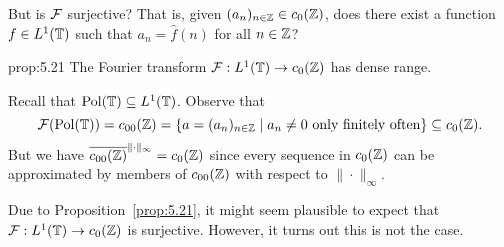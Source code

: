 But is ${\cal F}$ surjective? That is, given $(a_n)_{n\in\mathbb{Z}} \in c_0(\mathbb{Z})$, 
does there exist a function $f \in L^1(\mathbb{T})$ such that $a_n = \hat f(n)$ for all 
$n \in \mathbb{Z}$? 

\begin{prop}{prop:5.21}
    The Fourier transform ${\cal F} : L^1(\mathbb{T}) \to c_0(\mathbb{Z})$ has dense range. 
\end{prop}
\begin{pf}
    Recall that $\operatorname{Pol}(\mathbb{T}) \subseteq L^1(\mathbb{T})$. Observe that 
    \[ {\cal F}(\operatorname{Pol}(\mathbb{T})) = c_{00}(\mathbb{Z}) = 
    \{a = (a_n)_{n\in\mathbb{Z}} \mid a_n \neq 0 \text{ only finitely often}\} 
    \subseteq c_0(\mathbb{Z}). \] 
    But we have $\overline{c_{00}(\mathbb{Z})}^{\|\cdot\|_\infty} = c_0(\mathbb{Z})$ 
    since every sequence in $c_0(\mathbb{Z})$ can be approximated by 
    members of $c_{00}(\mathbb{Z})$ with respect to $\|\cdot\|_\infty$. 
\end{pf}

Due to Proposition~\ref{prop:5.21}, it might seem plausible to expect 
that ${\cal F} : L^1(\mathbb{T}) \to c_0(\mathbb{Z})$ is surjective. However, it turns 
out this is not the case. 

